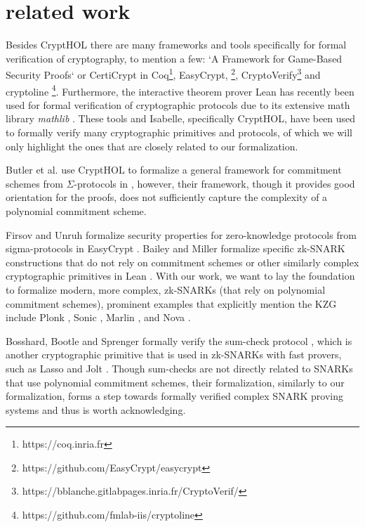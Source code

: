 \section{related work}
Besides CryptHOL there are many frameworks and tools specifically for formal verification of cryptography, to mention a few: `A Framework for Game-Based Security Proofs` \parencite{game_based_coq} or CertiCrypt \parencite{crypto_coq} in Coq\footnote{https://coq.inria.fr}, EasyCrypt, \footnote{https://github.com/EasyCrypt/easycrypt}, CryptoVerify\footnote{https://bblanche.gitlabpages.inria.fr/CryptoVerif/} and cryptoline \footnote{https://github.com/fmlab-iis/cryptoline}. Furthermore, the interactive theorem prover Lean \parencite{Lean} has recently been used for formal verification of cryptographic protocols due to its extensive math library \textit{mathlib} \parencite{Lean_groth16}.
These tools and Isabelle, specifically CryptHOL, have been used to formally verify many cryptographic primitives and protocols, of which we will only highlight the ones that are closely related to our formalization.

Butler et al. use CryptHOL to formalize a general framework for commitment schemes from $\Sigma$-protocols in \parencite{sigma_commit_crypto}, however, their framework, though it provides good orientation for the proofs, does not sufficiently capture the complexity of a polynomial commitment scheme.

Firsov and Unruh formalize security properties for zero-knowledge protocols from sigma-protocols in EasyCrypt \parencite{zk_easycrypt}.
Bailey and Miller formalize specific zk-SNARK constructions that do not rely on commitment schemes or other similarly complex cryptographic primitives in Lean \parencite{Lean_groth16}. With our work, we want to lay the foundation to formalize modern, more complex, zk-SNARKs (that rely on polynomial commitment schemes), prominent examples that explicitly mention the KZG include Plonk \parencite{plonk}, Sonic \parencite{sonic}, Marlin \parencite{marlin}, and Nova \parencite{nova}.

Bosshard, Bootle and Sprenger formally verify the sum-check protocol \parencite{sumcheck_Isabelle}, which is another cryptographic primitive that is used in zk-SNARKs with fast provers, such as Lasso and Jolt \parencite{Lasso, jolt}. Though sum-checks are not directly related to SNARKs that use polynomial commitment schemes, their formalization, similarly to our formalization, forms a step towards formally verified complex SNARK proving systems and thus is worth acknowledging.